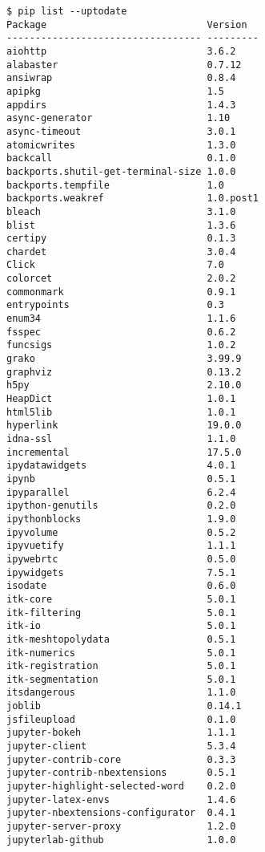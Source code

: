 \documentclass[11pt,a4paper]{article}
\begin{document}
\begin{verbatim}
$ pip list --uptodate
Package                            Version
---------------------------------- ---------
aiohttp                            3.6.2
alabaster                          0.7.12
ansiwrap                           0.8.4
apipkg                             1.5
appdirs                            1.4.3
async-generator                    1.10
async-timeout                      3.0.1
atomicwrites                       1.3.0
backcall                           0.1.0
backports.shutil-get-terminal-size 1.0.0
backports.tempfile                 1.0
backports.weakref                  1.0.post1
bleach                             3.1.0
blist                              1.3.6
certipy                            0.1.3
chardet                            3.0.4
Click                              7.0
colorcet                           2.0.2
commonmark                         0.9.1
entrypoints                        0.3
enum34                             1.1.6
fsspec                             0.6.2
funcsigs                           1.0.2
grako                              3.99.9
graphviz                           0.13.2
h5py                               2.10.0
HeapDict                           1.0.1
html5lib                           1.0.1
hyperlink                          19.0.0
idna-ssl                           1.1.0
incremental                        17.5.0
ipydatawidgets                     4.0.1
ipynb                              0.5.1
ipyparallel                        6.2.4
ipython-genutils                   0.2.0
ipythonblocks                      1.9.0
ipyvolume                          0.5.2
ipyvuetify                         1.1.1
ipywebrtc                          0.5.0
ipywidgets                         7.5.1
isodate                            0.6.0
itk-core                           5.0.1
itk-filtering                      5.0.1
itk-io                             5.0.1
itk-meshtopolydata                 0.5.1
itk-numerics                       5.0.1
itk-registration                   5.0.1
itk-segmentation                   5.0.1
itsdangerous                       1.1.0
joblib                             0.14.1
jsfileupload                       0.1.0
jupyter-bokeh                      1.1.1
jupyter-client                     5.3.4
jupyter-contrib-core               0.3.3
jupyter-contrib-nbextensions       0.5.1
jupyter-highlight-selected-word    0.2.0
jupyter-latex-envs                 1.4.6
jupyter-nbextensions-configurator  0.4.1
jupyter-server-proxy               1.2.0
jupyterlab-github                  1.0.0

\end{verbatim}
\end{document}
